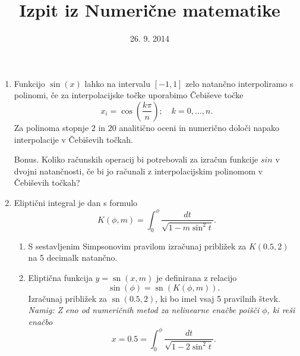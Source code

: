 \documentclass[slovene]{article}
\DeclareMathOperator*\sn{sn}
\begin{document}
\title{Izpit iz Numerične matematike}


\date{26. 9. 2014}
\maketitle
\begin{enumerate}
\item Funkcijo $\sin(x)$ lahko na intervalu $[-1,1]$ zelo natančno interpoliramo s polinomi, če za interpolacijske točke uporabimo Čebiševe točke
$$
x_i=\cos(\frac{k\pi}{n}); \quad k=0,\ldots,n.
$$ 
Za polinoma stopnje $2$ in $20$ analitično oceni in numerično določi napako interpolacije v Čebiševih točkah. 

Bonus. Koliko računskih operacij bi potrebovali za izračun funkcije $sin$ 
v dvojni natančnosti, če bi jo računali z interpolacijskim polinomom v Čebiševih točkah? 

\item Eliptični integral je dan s formulo
  \begin{equation}
    \label{eq:int}
    K(\phi,m) = \int_0^\phi\frac{dt}{\sqrt{1-m\sin^2t}}.
  \end{equation}
\begin{enumerate}
\item
S sestavljenim Simpsonovim pravilom izračunaj približek za $K(0.5,2)$ na 5 
decimalk natančno.  
\item Eliptična funkcija $y=\sn(x,m)$ je definirana z relacijo
\begin{equation}
\sin(\phi)=\sn\left(K(\phi,m)\right).\label{eq:sn}
\end{equation}
Izračunaj približek za $\sn(0.5,2)$, ki bo imel vsaj 5 pravilnih števk. \emph{Namig: Z eno od 
numeričnih metod za nelinearne enačbe poišči $\phi$, ki reši enačbo
\begin{equation}
  \label{eq:enacba}
   x = 0.5 = \int_0^\phi\frac{dt}{\sqrt{1-2\sin^2t}}.
\end{equation}}
\end{enumerate}
\end{enumerate}
\end{document}
